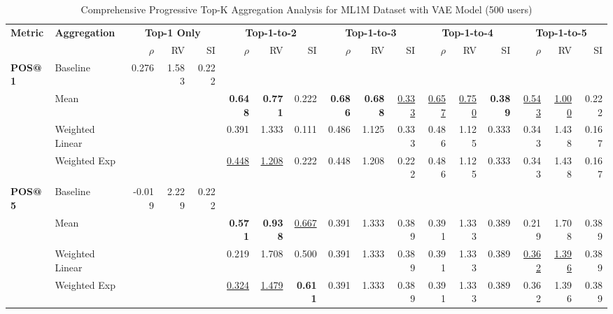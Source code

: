 \documentclass{article}
\begin{document}
\begin{table}[htbp]
\centering
\caption{Comprehensive Progressive Top-K Aggregation Analysis for ML1M Dataset with VAE Model (500 users)}
\label{tab:ml1m_vae_progressive_topk_comprehensive_500users}
\scriptsize
\begin{tabular}{@{}llrrr|rrr|rrr|rrr|rrr@{}}
\toprule
\multirow{2}{*}{\textbf{Metric}} & \multirow{2}{*}{\textbf{Aggregation}} & \multicolumn{3}{c|}{\textbf{Top-1 Only}} & \multicolumn{3}{c|}{\textbf{Top-1-to-2}} & \multicolumn{3}{c|}{\textbf{Top-1-to-3}} & \multicolumn{3}{c|}{\textbf{Top-1-to-4}} & \multicolumn{3}{c}{\textbf{Top-1-to-5}} \\
\cmidrule(lr){3-5} \cmidrule(lr){6-8} \cmidrule(lr){9-11} \cmidrule(lr){12-14} \cmidrule(lr){15-17}
& & $\rho$ & RV & SI & $\rho$ & RV & SI & $\rho$ & RV & SI & $\rho$ & RV & SI & $\rho$ & RV & SI \\
\midrule

\multirow{4}{*}{\textbf{POS@1}} 
& Baseline & 0.276 & 1.583 & 0.222 & & & & & & & & & & & & \\
& Mean & & & & \textbf{0.648} & \textbf{0.771} & 0.222 & \textbf{0.686} & \textbf{0.688} & \uline{0.333} & \uline{0.657} & \uline{0.750} & \textbf{0.389} & \uline{0.543} & \uline{1.000} & 0.222 \\
& Weighted Linear & & & & 0.391 & 1.333 & 0.111 & 0.486 & 1.125 & 0.333 & 0.486 & 1.125 & 0.333 & 0.343 & 1.438 & 0.167 \\
& Weighted Exp & & & & \uline{0.448} & \uline{1.208} & 0.222 & 0.448 & 1.208 & 0.222 & 0.486 & 1.125 & 0.333 & 0.343 & 1.438 & 0.167 \\
\midrule

\multirow{4}{*}{\textbf{POS@5}} 
& Baseline & -0.019 & 2.229 & 0.222 & & & & & & & & & & & & \\
& Mean & & & & \textbf{0.571} & \textbf{0.938} & \uline{0.667} & 0.391 & 1.333 & 0.389 & 0.391 & 1.333 & 0.389 & 0.219 & 1.708 & 0.389 \\
& Weighted Linear & & & & 0.219 & 1.708 & 0.500 & 0.391 & 1.333 & 0.389 & 0.391 & 1.333 & 0.389 & \uline{0.362} & \uline{1.396} & 0.389 \\
& Weighted Exp & & & & \uline{0.324} & \uline{1.479} & \textbf{0.611} & 0.391 & 1.333 & 0.389 & 0.391 & 1.333 & 0.389 & 0.362 & 1.396 & 0.389 \\
\midrule


\end{tabular}
\end{table}
\end{document}
